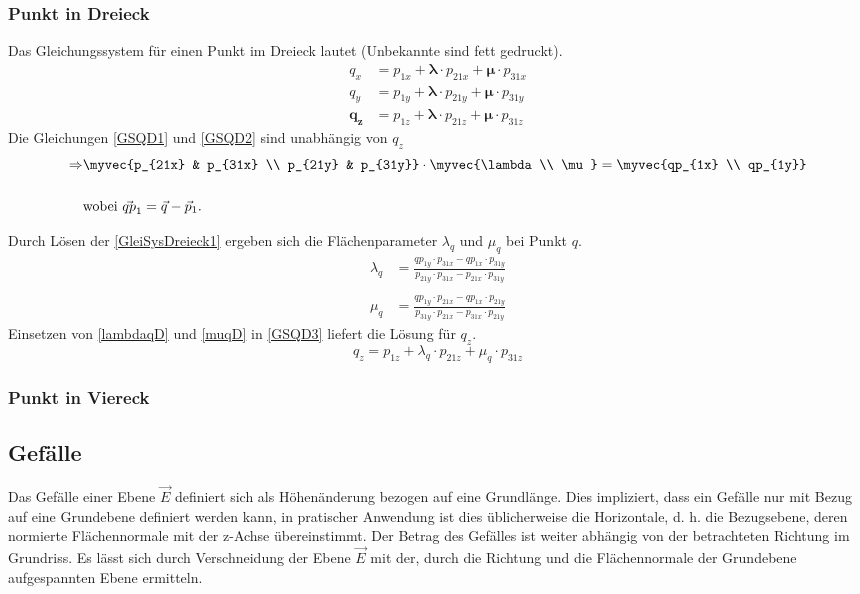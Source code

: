 \subsubsection{Punkt in Dreieck}
Das Gleichungssystem für einen Punkt im Dreieck lautet (Unbekannte sind fett gedruckt).
\begin{align}
	\label{GSQD1} q_{x} &= p_{1x} + \bm{\lambda} \cdot p_{21x} + \bm{\mu} \cdot p_{31x}\\
	\label{GSQD2} q_{y} &= p_{1y} + \bm{\lambda} \cdot p_{21y} + \bm{\mu} \cdot p_{31y} \\
	\label{GSQD3} \bm{q_{z}} &= p_{1z} + \bm{\lambda} \cdot p_{21z} + \bm{\mu} \cdot p_{31z}
\end{align}
Die Gleichungen \ref{GSQD1} und \ref{GSQD2} sind unabhängig von $q_{z}$
\begin{align}
	\label{GleiSysDreieck1}
	\Rightarrow &\myvec{p_{21x} & p_{31x} \\ p_{21y} & p_{31y}} \cdot \myvec{\lambda \\ \mu} = \myvec{qp_{1x} \\ qp_{1y}} \\ \nonumber \\
	\nonumber & \text{wobei } \vec{qp}_{1} = \vec{q} - \vec{p}_{1}.
\end{align}

Durch Lösen der \cref{GleiSysDreieck1} ergeben sich die Flächenparameter $\lambda_{q}$ und  $\mu_{q}$ bei Punkt $q$.
\begin{align}
	\label{lambdaqD}
	\lambda_{q} &= \frac{qp_{1y} \cdot p_{31x} - qp_{1x} \cdot p_{31y}}{p_{21y} \cdot p_{31x} - p_{21x} \cdot p_{31y}}\\
	\nonumber \\
	\label{muqD}
	\mu_{q} &= \frac{qp_{1y} \cdot p_{21x} - qp_{1x} \cdot p_{21y}}{p_{31y} \cdot p_{21x} - p_{31x} \cdot p_{21y}}
\end{align}
Einsetzen von \cref{lambdaqD} und \cref{muqD} in \cref{GSQD3} liefert die Lösung für $q_{z}$.
\begin{equation}
	\boxed{
		q_{z} = p_{1z} + \lambda_{q} \cdot p_{21z} + \mu_{q} \cdot p_{31z}
	}
\end{equation}
\subsubsection{Punkt in Viereck}



\subsection{Gefälle}
Das Gefälle einer Ebene $\vec{E}$ definiert sich als Höhenänderung bezogen auf eine Grundlänge. Dies impliziert, dass ein Gefälle nur mit Bezug auf eine Grundebene definiert werden kann, in pratischer Anwendung ist dies üblicherweise die Horizontale, d. h. die Bezugsebene, deren normierte Flächennormale mit der z-Achse übereinstimmt. Der Betrag des Gefälles ist weiter abhängig von der betrachteten Richtung im Grundriss. Es lässt sich durch Verschneidung der Ebene $\vec{E}$ mit der, durch die Richtung und die Flächennormale der Grundebene aufgespannten Ebene ermitteln.

